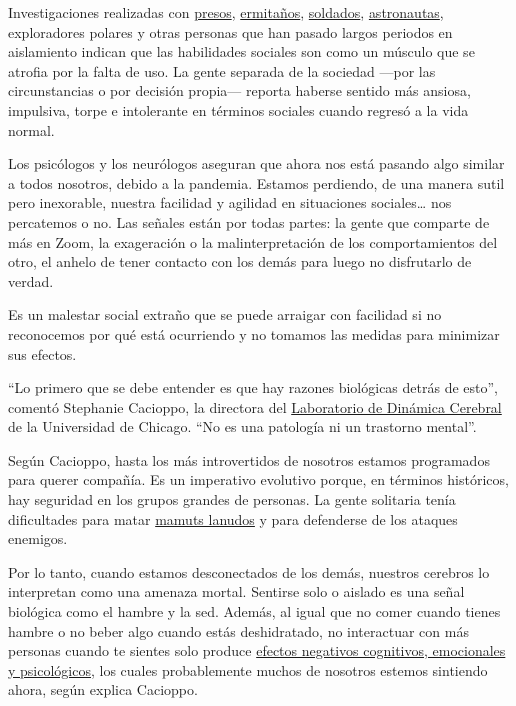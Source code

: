 Investigaciones realizadas con
\href{https://www.ncjrs.gov/App/abstractdb/AbstractDBDetails.aspx?id=142494}{presos},
\href{https://scalar.usc.edu/works/bodies/Hikikomori:\%20The\%20Postmodern\%20Hermits\%20of\%20Japan\%20\%7C\%20Warscapes_thumb.pdf}{ermitaños},
\href{https://www.tandfonline.com/doi/abs/10.1080/15332985.2018.1522607}{soldados},
\href{https://www.nasa.gov/hrp/bodyinspace}{astronautas}, exploradores
polares y otras personas que han pasado largos periodos en aislamiento
indican que las habilidades sociales son como un músculo que se atrofia
por la falta de uso. La gente separada de la sociedad ---por las
circunstancias o por decisión propia--- reporta haberse sentido más
ansiosa, impulsiva, torpe e intolerante en términos sociales cuando
regresó a la vida normal.

Los psicólogos y los neurólogos aseguran que ahora nos está pasando algo
similar a todos nosotros, debido a la pandemia. Estamos perdiendo, de
una manera sutil pero inexorable, nuestra facilidad y agilidad en
situaciones sociales\ldots{} nos percatemos o no. Las señales están por
todas partes: la gente que comparte de más en Zoom, la exageración o la
malinterpretación de los comportamientos del otro, el anhelo de tener
contacto con los demás para luego no disfrutarlo de verdad.

Es un malestar social extraño que se puede arraigar con facilidad si no
reconocemos por qué está ocurriendo y no tomamos las medidas para
minimizar sus efectos.

``Lo primero que se debe entender es que hay razones biológicas detrás
de esto'', comentó Stephanie Cacioppo, la directora del
\href{https://braindynamics.uchicago.edu/}{Laboratorio de Dinámica
Cerebral} de la Universidad de Chicago. ``No es una patología ni un
trastorno mental''.

Según Cacioppo, hasta los más introvertidos de nosotros estamos
programados para querer compañía. Es un imperativo evolutivo porque, en
términos históricos, hay seguridad en los grupos grandes de personas. La
gente solitaria tenía dificultades para matar
\href{https://www.thevintagenews.com/2019/01/19/mammoth-bone/}{mamuts
lanudos} y para defenderse de los ataques enemigos.

Por lo tanto, cuando estamos desconectados de los demás, nuestros
cerebros lo interpretan como una amenaza mortal. Sentirse solo o aislado
es una señal biológica como el hambre y la sed. Además, al igual que no
comer cuando tienes hambre o no beber algo cuando estás deshidratado, no
interactuar con más personas cuando te sientes solo produce
\href{https://www.ncbi.nlm.nih.gov/pmc/articles/PMC5783394/}{efectos
negativos cognitivos, emocionales y psicológicos}, los cuales
probablemente muchos de nosotros estemos sintiendo ahora, según explica
Cacioppo.

